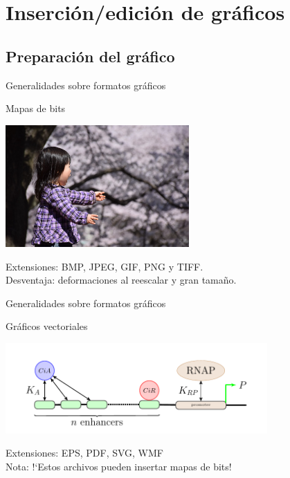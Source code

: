 \documentclass[10pt]{beamer}
\begin{document}
\section{Inserción/edición de gráficos}
\subsection{Preparación del gráfico}
\begin{frame}{Generalidades sobre formatos gr\'aficos}
\begin{block}{Mapas de bits} 
\begin{center}
\includegraphics[width=7cm]{../graficos/sorpresa.jpg}
\end{center}
Extensiones: BMP, JPEG, GIF, PNG y TIFF. \\
{\small Desventaja: deformaciones al reescalar y gran tama\~no.}
\end{block}
\end{frame}
\begin{frame}{Generalidades sobre formatos gr\'aficos}
\begin{block} {Gr\'aficos vectoriales} 
\begin{center}
\includegraphics[width=10cm]{../graficos/bp2.pdf}
\end{center}
Extensiones: EPS, PDF, SVG, WMF \\
{\small Nota: !`Estos archivos pueden insertar mapas de bits! }
\end{block}
\end{frame}
\end{document}
